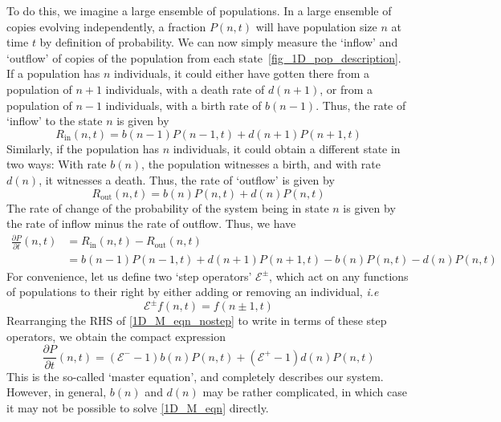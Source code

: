 To do this, we imagine a large ensemble of populations. In a large ensemble of copies evolving independently, a fraction $P(n,t)$ will have population size $n$ at time $t$ by definition of probability. We can now simply measure the `inflow' and `outflow' of copies of the population from each state~\ref{fig_1D_pop_description}. If a population has $n$ individuals, it could either have gotten there from a population of $n+1$ individuals, with a death rate of $d(n+1)$, or from a population of $n-1$ individuals, with a birth rate of $b(n-1)$. Thus, the rate of `inflow' to the state $n$ is given by
\begin{equation}
\label{1D_rate_in}
R_{\textrm{in}}(n,t) = b(n-1)P(n-1,t) + d(n+1)P(n+1,t)
\end{equation}
Similarly, if the population has $n$ individuals, it could obtain a different state in two ways: With rate $b(n)$, the population witnesses a birth, and with rate $d(n)$, it witnesses a death. Thus, the rate of `outflow' is given by
\begin{equation}
\label{1D_rate_out}
R_{\textrm{out}}(n,t) = b(n)P(n,t) + d(n)P(n,t)
\end{equation}
The rate of change of the probability of the system being in state $n$ is given by the rate of inflow minus the rate of outflow. Thus, we have
\begin{align}
\frac{\partial P}{\partial t}(n,t) &= R_{\textrm{in}}(n,t) - R_{\textrm{out}}(n,t)\nonumber\\
&= b(n-1)P(n-1,t) + d(n+1)P(n+1,t) - b(n)P(n,t) - d(n)P(n,t)\label{1D_M_eqn_nostep}
\end{align}
For convenience, let us define two `step operators' $\mathcal{E}^{\pm}$, which act on any functions of populations to their right by either adding or removing an individual, \textit{i.e}
\begin{equation*}
\mathcal{E}^{\pm}f(n,t) = f(n \pm 1,t)
\end{equation*}
Rearranging the RHS of \eqref{1D_M_eqn_nostep} to write in terms of these step operators, we obtain the compact expression
\begin{equation}
\label{1D_M_eqn}
\frac{\partial P}{\partial t}(n,t) = (\mathcal{E}^{-}-1)b(n)P(n,t) + (\mathcal{E}^{+}-1)d(n)P(n,t)
\end{equation}
This is the so-called `master equation', and completely describes our system. However, in general, $b(n)$ and $d(n)$ may be rather complicated, in which case it may not be possible to solve \eqref{1D_M_eqn} directly.

